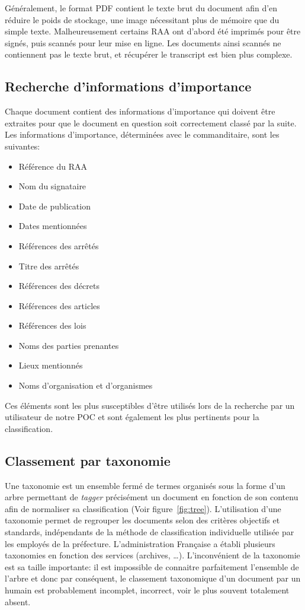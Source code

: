 Généralement, le format PDF contient le texte brut du document afin d'en réduire le poids de stockage, une image nécessitant plus de mémoire que du simple texte.
Malheureusement certains RAA ont d'abord été imprimés pour être signés, puis scannés pour leur mise en ligne.
Les documents ainsi scannés ne contiennent pas le texte brut, et récupérer le transcript est bien plus complexe.


\subsection{Recherche d'informations d'importance}\label{infosImp}
Chaque document contient des informations d'importance qui doivent être extraites pour que le document en question soit correctement classé par la suite.
Les informations d'importance, déterminées avec le commanditaire, sont les suivantes:
\begin{itemize}
\item Référence du RAA
\item Nom du signataire
\item Date de publication
\item Dates mentionnées
\item Références des arrêtés
\item Titre des arrêtés
\item Références des décrets
\item Références des articles
\item Références des lois
\item Noms des parties prenantes
\item Lieux mentionnés
\item Noms d'organisation et d'organismes
\end{itemize}

Ces éléments sont les plus susceptibles d'être utilisés lors de la recherche par un utilisateur de notre POC et sont également les plus pertinents pour la classification.



\subsection{Classement par taxonomie}
Une taxonomie est un ensemble fermé de termes organisés sous la forme d'un arbre permettant de \textit{tagger} précisément un document en fonction de son contenu afin de normaliser sa classification (Voir figure~\ref{fig:tree}).
L'utilisation d'une taxonomie permet de regrouper les documents selon des critères objectifs et standards, indépendants de la méthode de classification individuelle utilisée par les employés de la préfecture.
L'administration Française a établi plusieurs taxonomies en fonction des services (archives, \ldots).
L'inconvénient de la taxonomie est sa taille importante: il est impossible de connaitre parfaitement l'ensemble de l'arbre et donc par conséquent, le classement taxonomique d'un document par un humain est probablement incomplet, incorrect, voir le plus souvent totalement absent.


